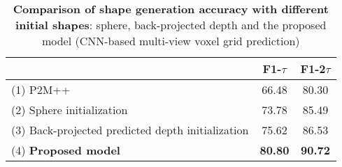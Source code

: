 \begin{table}[ht]
\begin{center}
\footnotesize
\begin{tabular}{ l c c }
\toprule[1pt]
 &F1-$\tau$ &F1-2$\tau$   \\ \hline
(1) P2M++ & 66.48 & 80.30 \\
(2) Sphere initialization & 73.78 & 85.49 \\
(3) Back-projected predicted depth initialization & 75.62 & 86.53 \\
(4) \bf{Proposed model}  & \textbf{80.80} & \textbf{90.72}\\
\bottomrule[1pt]
\end{tabular}
\end{center}
\vspace{-4mm}
\caption{
    \textbf{Comparison of shape generation accuracy with different initial shapes}: sphere, back-projected depth and the proposed model (CNN-based multi-view voxel grid prediction)}
\label{table:initial_shape}
\end{table}

